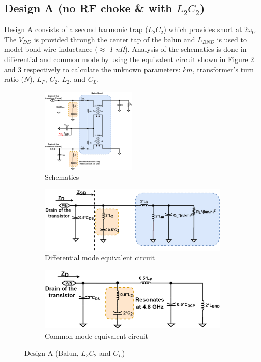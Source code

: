 \documentclass[conference]{IEEEtran}
\begin{document}
\subsection{Design A (no RF choke \& with $L_2C_2$)}
Design A consists of a second harmonic trap ($L_2C_2$) which provides short at $2\omega_0$. The $V_{DD}$ is provided through the center tap of the balun and $L_{BND}$ is used to model bond-wire inductance ($\approx$ \textit{1 nH}).
Analysis of the schematics is done in differential and common mode by using the equivalent circuit shown in Figure \ref{fig:Design_A_Diff} and \ref{fig:Design_A_Com} respectively to calculate the unknown parameters: $km$, transformer's turn ratio ($N$), $L_P$, $C_2$, $L_2$, and $C_L$.
\begin{figure}[!t]
\captionsetup{font=footnotesize}
\centering
\begin{subfigure}{0.5\textwidth}
\centering
\includegraphics[width=0.5\textwidth]{Images/Design/Design_A_FC.png}
\caption{Schematics}
\label{fig:Design_A_FC}
\end{subfigure}
\begin{subfigure}[b]{0.24\textwidth}
\includegraphics[width=1\textwidth]{Images/Design/Design_A_Diff.png}
\caption{Differential mode equivalent circuit}
\label{fig:Design_A_Diff}
\end{subfigure}
\begin{subfigure}[b]{0.24\textwidth}
\includegraphics[width=1\textwidth]{Images/Design/Design_A_Com.png}
\caption{Common mode equivalent circuit}
\label{fig:Design_A_Com}
\end{subfigure}
\caption{Design A (Balun, $L_2C_2$ and $C_L$)}
\label{fig:Design_A}
\vspace{-0.3in}
\end{figure}
\end{document}
